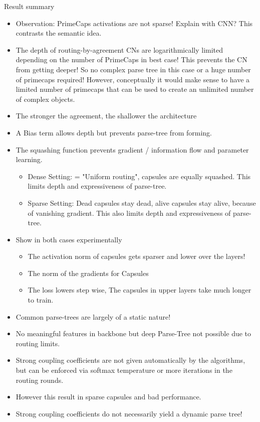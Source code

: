 \documentclass{article}
\begin{document}
Result summary
\begin{itemize}
	\item Observation: PrimeCaps activations are not sparse! Explain with CNN? This contrasts the semantic idea.
	\item The depth of routing-by-agreement CNs are logarithmically limited depending on the number of PrimeCaps in best case! This prevents the CN from getting deeper! So no complex parse tree in this case or a huge number of primecaps required! However, conceptually it would make sense to have a limited number of primecaps that can be used to create an unlimited number of complex objects.
	\item The stronger the agreement, the shallower the architecture
	\item A Bias term allows depth but prevents parse-tree from forming.
	\item The squashing function prevents gradient / information flow and parameter learning.
	\begin{itemize}
		\item Dense Setting: = "Uniform routing", capsules are equally squashed. This limits depth and expressiveness of parse-tree.
		\item Sparse Setting: Dead capsules stay dead, alive capsules stay alive, because of vanishing gradient. This also limits depth and expressiveness of parse-tree.
	\end{itemize}
	\item Show in both cases experimentally
	\begin{itemize}
		\item The activation norm of capsules gets sparser and lower over the layers!
		\item The norm of the gradients for Capsules
		\item The loss lowers step wise, The capsules in upper layers take much longer to train.
	\end{itemize}
	\item Common parse-trees are largely of a static nature!
	\item No meaningful features in backbone but deep Parse-Tree not possible due to routing limits.
	\item Strong coupling coefficients are not given automatically by the algorithms, but can be enforced via softmax temperature or more iterations in the routing rounds.
	\item However this result in sparse capsules and bad performance.
	\item Strong coupling coefficients do not necessarily yield a dynamic parse tree!

\end{itemize}
\end{document}
